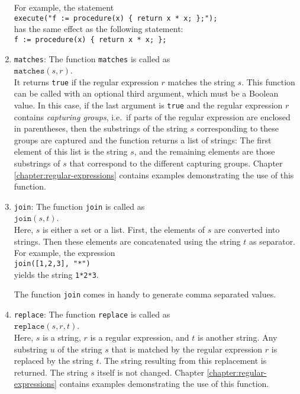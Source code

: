 \begin{enumerate}
      For example, the statement
      \\[0.2cm]
      \hspace*{1.3cm}
      \texttt{execute("f := procedure(x) \{ return x * x; \};");}
      \\[0.2cm]
      has the same effect as the following statement:
      \\[0.2cm]
      \hspace*{1.3cm}
      \texttt{f := procedure(x) \{ return x * x; \};}
\item \texttt{matches}:  The function \texttt{matches} is called as
      \\[0.2cm]
      \hspace*{1.3cm}
      $\texttt{matches}(s, r)$.
      \\[0.2cm]
      It returns \texttt{true} if the regular expression $r$ matches the string $s$.
      This function can be called with an optional third argument, which must be a Boolean
      value.  In this case, if the last argument is \texttt{true} and the regular
      expression $r$ contains \emph{capturing groups}, i.e.~if parts of the regular
      expression are enclosed in parentheses, then the substrings of the string $s$
      corresponding to these groups are
      captured and the function returns a list of strings:  The first element of this
      list is the string $s$, and the remaining elements are those substrings of $s$ that
      correspond to the different capturing groups.  
      Chapter \ref{chapter:regular-expressions} contains examples demonstrating the use of this function.
      
\item \texttt{join}: The function \texttt{join} is called as
      \\[0.2cm]
      \hspace*{1.3cm}
      $\texttt{join}(s,t)$.
      \\[0.2cm]
      Here, $s$ is either a set or a list.  First, the elements of $s$ are converted into
      strings.  Then these elements are concatenated using the string $t$ as separator.
      For example, the expression
      \\[0.2cm]
      \hspace*{1.3cm}
      \texttt{join([1,2,3], "*")}
      \\[0.2cm]
      yields the string \texttt{1*2*3}.  

      The function \texttt{join} comes in handy to generate comma separated values.
\item \texttt{replace}: The function \texttt{replace} is called as
      \\[0.2cm]
      \hspace*{1.3cm}
      $\mathtt{replace}(s, r, t)$.
      \\[0.2cm]
      Here, $s$ is a string, $r$ is a regular expression, and $t$ is another string.
      Any substring $u$ of the string $s$ that is matched by the regular expression $r$ is
      replaced by the string $t$.  The string resulting from this replacement is returned.
      The string $s$ itself is not changed.
      Chapter \ref{chapter:regular-expressions} contains examples demonstrating the use of this function.


\end{enumerate}
